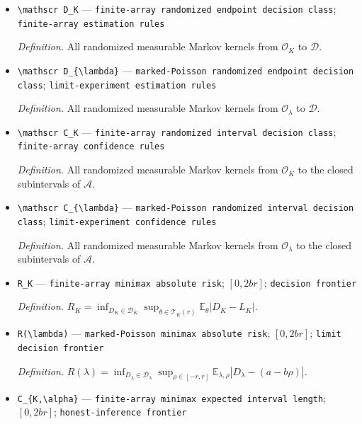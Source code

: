 \documentclass{article}
\begin{document}
\begin{itemize}
  \item \texttt{\textbackslash{}\allowbreak{}mathscr D\_\allowbreak{}K} --- \texttt{finite-\allowbreak{}array randomized endpoint decision class}; \texttt{finite-\allowbreak{}array estimation rules}
  \par\smallskip\noindent\emph{Definition.} All randomized measurable Markov kernels from \(\mathcal O_K\) to \(\mathcal D\).
  \item \texttt{\textbackslash{}\allowbreak{}mathscr D\_\allowbreak{}\{\textbackslash{}\allowbreak{}lambda\}\allowbreak{}} --- \texttt{marked-\allowbreak{}Poisson randomized endpoint decision class}; \texttt{limit-\allowbreak{}experiment estimation rules}
  \par\smallskip\noindent\emph{Definition.} All randomized measurable Markov kernels from \(\mathcal O_{\lambda}\) to \(\mathcal D\).
  \item \texttt{\textbackslash{}\allowbreak{}mathscr C\_\allowbreak{}K} --- \texttt{finite-\allowbreak{}array randomized interval decision class}; \texttt{finite-\allowbreak{}array confidence rules}
  \par\smallskip\noindent\emph{Definition.} All randomized measurable Markov kernels from \(\mathcal O_K\) to the closed subintervals of \(\mathcal A\).
  \item \texttt{\textbackslash{}\allowbreak{}mathscr C\_\allowbreak{}\{\textbackslash{}\allowbreak{}lambda\}\allowbreak{}} --- \texttt{marked-\allowbreak{}Poisson randomized interval decision class}; \texttt{limit-\allowbreak{}experiment confidence rules}
  \par\smallskip\noindent\emph{Definition.} All randomized measurable Markov kernels from \(\mathcal O_{\lambda}\) to the closed subintervals of \(\mathcal A\).
  \item \texttt{R\_\allowbreak{}K} --- \texttt{finite-\allowbreak{}array minimax absolute risk}; \([0,2br]\); \texttt{decision frontier}
  \par\smallskip\noindent\emph{Definition.} \(R_K=\inf_{D_K\in\mathscr D_K}\sup_{\theta\in\mathcal T_K(r)}\mathbb E_\theta|D_K-L_K|\).
  \item \texttt{R(\textbackslash{}\allowbreak{}lambda)} --- \texttt{marked-\allowbreak{}Poisson minimax absolute risk}; \([0,2br]\); \texttt{limit decision frontier}
  \par\smallskip\noindent\emph{Definition.} \(R(\lambda)=\inf_{D_{\lambda}\in\mathscr D_{\lambda}}\sup_{\rho\in[-r,r]}\mathbb E_{\lambda,\rho}|D_{\lambda}-(a-b\rho)|\).
  \item \texttt{C\_\allowbreak{}\{K,\allowbreak{}\textbackslash{}\allowbreak{}alpha\}\allowbreak{}} --- \texttt{finite-\allowbreak{}array minimax expected interval length}; \([0,2br]\); \texttt{honest-\allowbreak{}inference frontier}

\end{itemize}
\end{document}
